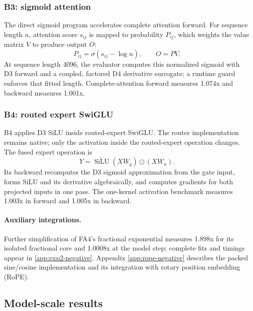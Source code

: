 \documentclass[11pt]{article}
\newcommand{\silu}{\operatorname{SiLU}}
\begin{document}
\subsubsection{B3: sigmoid attention}

The direct sigmoid program accelerates complete attention forward. For sequence
length $n$, attention score $s_{ij}$ is mapped to probability $P_{ij}$, which
weights the value matrix $V$ to produce output $O$:
\begin{equation}
    P_{ij}=\sigma(s_{ij}-\log n), \qquad O=PV.
    \label{eq:sigmoid-attention}
\end{equation}
At sequence length 4096, the evaluator computes this normalized sigmoid with
D3 forward and a coupled, factored D4 derivative surrogate; a runtime guard
enforces that fitted length. Complete-attention forward measures 1.074x and
backward measures 1.001x.

\subsubsection{B4: routed expert SwiGLU}

B4 applies D3 SiLU inside routed-expert SwiGLU. The router implementation
remains native; only the activation inside the routed-expert operation changes.
The fused expert operation is
\begin{equation}
    Y=\widetilde{\silu}(XW_g)\odot(XW_u).
\end{equation}
Its backward recomputes the D3 sigmoid approximation from the gate input,
forms SiLU and its derivative algebraically, and computes gradients for both
projected inputs in one pass. The one-kernel activation benchmark measures
1.003x in forward and 1.005x in backward.

\paragraph{Auxiliary integrations.}
Further simplification of FA4's fractional exponential measures 1.898x for its
isolated fractional core and 1.0008x at the model step; complete fits and
timings appear in \cref{app:exp2-negative}. Appendix
\ref{app:rope-negative} describes the packed sine/cosine implementation and its
integration with rotary position embedding (RoPE).

\FloatBarrier
\subsection{Model-scale results}
\end{document}
